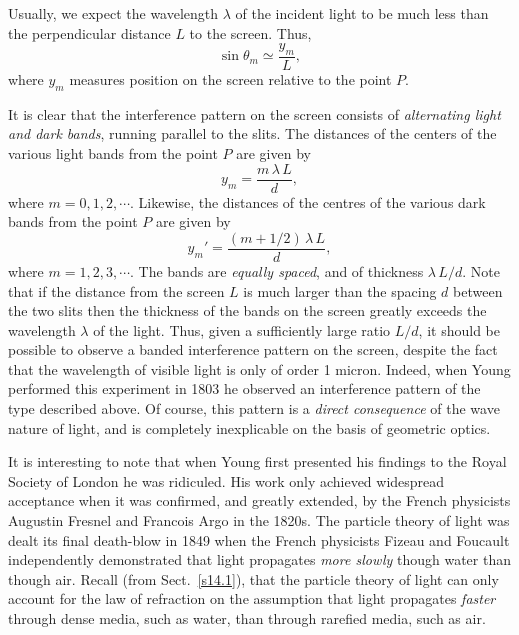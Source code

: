 Usually, we expect the wavelength $\lambda$ of the incident light
to be much less than the
perpendicular distance $L$ to the screen. Thus,
\begin{equation}
\sin\theta_m \simeq \frac{y_m}{L},
\end{equation}
where $y_m$ measures position on the screen relative to the point $P$. 

It is clear that the interference pattern on the screen consists of
{\em alternating light and dark bands}, running parallel to the slits. The
distances of the centers of the various light bands from the point $P$
are given by 
\begin{equation}\label{e14.8}
y_m = \frac{m\,\lambda\,L}{d},
\end{equation}
where $m=0,1,2,\cdots$. Likewise, the distances of the centres of the
various dark bands from the point $P$ are given by 
\begin{equation}
y_m' = \frac{(m+1/2)\,\lambda\,L}{d},
\end{equation}
where $m=1,2,3,\cdots$. 
The bands are {\em equally spaced}, and of thickness $\lambda\,L/d$. 
Note that if the distance from the screen $L$ is much larger than the
spacing $d$ between the two slits then the thickness of the bands
on the screen greatly exceeds the wavelength $\lambda$ of the light. Thus,
given a sufficiently large ratio $L/d$, it should be possible to observe
a banded
  interference pattern on the screen, despite the fact that the wavelength
of visible light is only of order 1 micron. Indeed, when Young performed this
experiment in 1803  he observed an interference pattern of the type
described above. Of course, this pattern is a {\em direct consequence}\/
 of the wave nature of light, and
  is completely inexplicable on the basis
of geometric optics.

It is interesting to note that when Young first presented his findings to
the Royal Society of London he was ridiculed. His work only achieved
widespread
acceptance when it was confirmed, and greatly extended, by the French
physicists Augustin Fresnel and Francois Argo in the 1820s. 
The particle theory of light was dealt its final death-blow
 in 1849 when the French physicists Fizeau and Foucault independently
demonstrated that light propagates  {\em more slowly}\/ though water than
though air. Recall (from Sect.~\ref{s14.1}),
 that the particle theory of light can only
account for the law of refraction on the assumption that light
propagates {\em faster}\/ through dense media, such as water, than through
rarefied media, such as air. 

